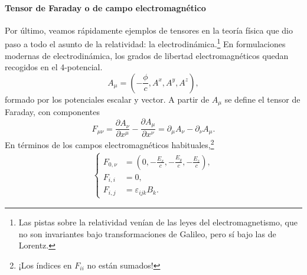 \paragraph{Tensor de Faraday o de campo electromagnético} Por último, veamos rápidamente ejemplos de tensores en la teoría física que dio paso a todo el asunto de la relatividad: la electrodinámica.\footnote{Las pistas sobre la relatividad venían de las leyes del electromagnetismo, que no son invariantes bajo transformaciones de Galileo, pero sí bajo las de Lorentz.} En formulaciones modernas de electrodinámica, los grados de libertad electromagnéticos quedan recogidos en el 4-potencial.
\begin{equation}
    A_\mu = \left(-\frac{\phi}{c}, A^x, A^y, A^z\right),
\end{equation}
formado por los potenciales escalar y vector. A partir de \(A_\mu\) se define el tensor de Faraday, con componentes
\begin{equation}
    F_{\mu\nu} = \frac{\partial A_\nu}{\partial x^\mu} - \frac{\partial A_\mu}{\partial x^\nu} = \partial_\mu A_\nu - \partial_\nu A_\mu. 
\end{equation}
En términos de los campos electromagnéticos habituales,\footnote{¡Los índices en \(F_{ii}\) no están sumados!}
\begin{align*}
    \left\{
    \begin{aligned}
        F_{0,\nu} &= \left(0, -\frac{E_x}{c}, -\frac{E_y}{c}, -\frac{E_z}{c}\right),\\
        F_{i,i} &= 0,\\
        F_{i,j} &= \varepsilon_{ijk}B_k.
    \end{aligned}\right.
\end{align*}

